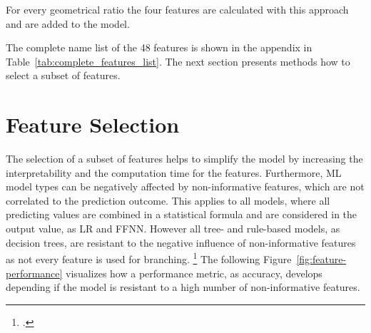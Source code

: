 For every geometrical ratio the four features are calculated with this approach and are added to the model.

\parbreak

The complete name list of the 48 features is shown in the appendix in Table~\ref{tab:complete_features_list}. The next section
presents methods how to select a subset of features.

\section{Feature Selection}
\label{sec:feature_engineering}

The selection of a subset of features helps to simplify the model by increasing the interpretability and the computation time
for the features. Furthermore, \gls{ML} model types can be negatively affected by non-informative features, which are not correlated
to the prediction outcome. This applies to all models, where all predicting values are combined in a statistical formula
and are considered in the output value, as \gls{LR} and \gls{FFNN}. However all tree- and rule-based models, as decision trees, are resistant
to the negative influence of non-informative features as not every feature is used for branching. \footcite[cf.][pp. 487-489]{kuhn_applied_2016}
The following Figure~\ref{fig:feature-performance} visualizes how a performance metric, as accuracy, develops depending if the model is
resistant to a high number of non-informative features.


